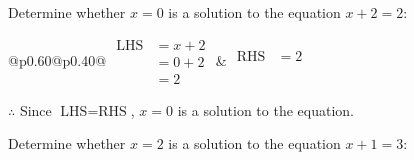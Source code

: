 \documentclass[12pt]{article}
\newcounter{minipagecount}
\begin{document}
\begin{multicols}{2}
\begin{minipage}[t]{0.40\textwidth}
    \noindent Determine whether \(x = 0\) is a solution to the equation \(x + 2 = 2\):
    \vspace{4pt}  %

    \noindent
    \renewcommand{\arraystretch}{1.3} %
    \begin{tabular}{@{}p{0.60\linewidth}@{}p{0.40\linewidth}@{}}
        \(\begin{aligned}
            \text{LHS} &= x + 2 \\
                    &= 0 + 2 \\
                    &= 2 
        \end{aligned}\) &
        \(\begin{aligned}
            \text{RHS} &= 2\\
                    & \\
                    &
        \end{aligned}\)
    \end{tabular}
    \renewcommand{\arraystretch}{1.0} %
    \vspace{2pt}  %

    \noindent \(\therefore\) Since \(\text{LHS} = \text{RHS}\), \(x = 0\) is  a solution to the equation.

\end{minipage}

 \vspace*{16pt}
\noindent{(\theminipagecount)}\hspace{0.1mm} %
\begin{minipage}[t]{0.40\textwidth} %

    \noindent Determine whether \(x = 2\) is a solution to the equation \(x + 1 = 3\):
    \vspace{4pt}  %


\end{minipage}
\end{multicols}
\end{document}
